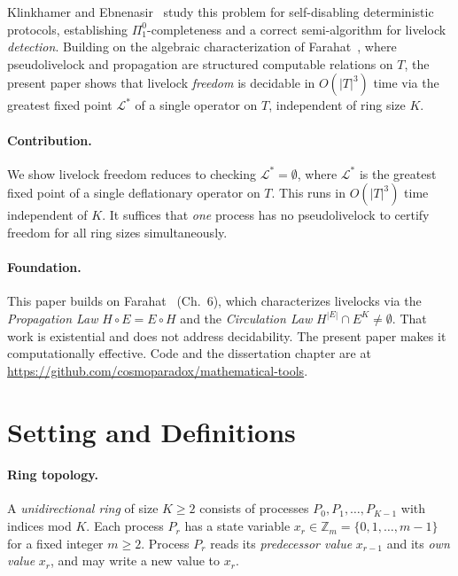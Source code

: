 \documentclass{article}
\newcommand{\Ls}{\mathcal{L}^{*}}
\newcommand{\Zm}{\mathbb{Z}_m}
\begin{document}
Klinkhamer and Ebnenasir~\citep{klinkhamer2013,klinkhamer2019} study
this problem for self-disabling deterministic protocols, establishing
$\Pi^0_1$-completeness and a correct semi-algorithm for livelock
\emph{detection}.  Building on the algebraic characterization of
Farahat~\citep{farahat2012}, where pseudolivelock and propagation are
structured computable relations on $T$, the present paper shows that
livelock \emph{freedom} is decidable in $O(|T|^3)$ time via the
greatest fixed point $\Ls$ of a single operator on $T$, independent of
ring size $K$.

\paragraph{Contribution.}
We show livelock freedom reduces to checking $\Ls = \emptyset$, where
$\Ls$ is the greatest fixed point of a single deflationary operator on
$T$. This runs in $O(|T|^3)$ time independent of $K$. It suffices that
\emph{one} process has no pseudolivelock to certify freedom for all
ring sizes simultaneously.

\paragraph{Foundation.}
This paper builds on Farahat~\citep{farahat2012} (Ch.~6), which
characterizes livelocks via the \emph{Propagation Law}
$H\!\circ\!E = E\!\circ\!H$ and the \emph{Circulation Law}
$H^{|E|}\cap E^K\!\neq\!\emptyset$. That work is existential and does
not address decidability. The present paper makes it computationally
effective. Code and the dissertation chapter are at
\url{https://github.com/cosmoparadox/mathematical-tools}.

\section{Setting and Definitions}

\paragraph{Ring topology.}
A \emph{unidirectional ring} of size $K\!\geq\!2$ consists of processes
$P_0,P_1,\ldots,P_{K-1}$ with indices mod $K$. Each process $P_r$ has a
state variable $x_r \in \Zm = \{0,1,\ldots,m-1\}$ for a fixed integer
$m\!\geq\!2$. Process $P_r$ reads its \emph{predecessor value}
$x_{r-1}$ and its \emph{own value} $x_r$, and may write a new value to
$x_r$.
\end{document}
